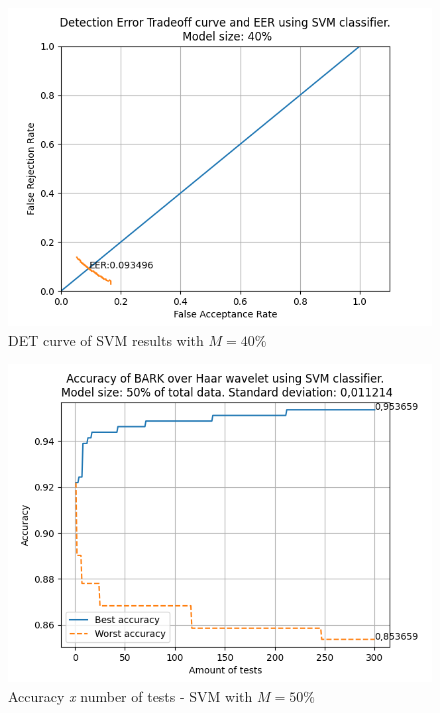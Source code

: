 \begin{figure}[H]
\centering
\includegraphics[scale=.6]{images/results/det/DET_SVM_40}
\caption{DET curve of SVM results with $M=40\%$}
\label{fig:detsvm40}
\end{figure}
\begin{figure}[H]
\centering
\includegraphics[scale=.6]{images/results/confusionMatrices/classifier_SVM_50.png}
\caption{Accuracy \textit{x} number of tests - SVM with $M=50\%$}
\label{fig:classifiersvm50}
\end{figure}

